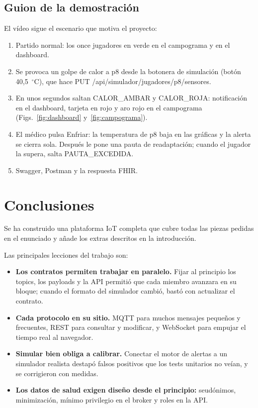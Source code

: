 \documentclass[runningheads]{llncs}
\begin{document}
\subsection{Guion de la demostración}

El vídeo sigue el escenario que motiva el proyecto:

\begin{enumerate}
  \item Partido normal: los once jugadores en verde en el campograma y en el dashboard.
  \item Se provoca un golpe de calor a p8 desde la botonera de simulación (botón 40,5~$^\circ$C), que hace PUT /api/simulador/jugadores/p8/sensores.
  \item En unos segundos saltan CALOR\_AMBAR y CALOR\_ROJA: notificación en el dashboard, tarjeta en rojo y aro rojo en el campograma (Figs.~\ref{fig:dashboard} y~\ref{fig:campograma}).
  \item El médico pulsa Enfriar: la temperatura de p8 baja en las gráficas y la alerta se cierra sola. Después le pone una pauta de readaptación; cuando el jugador la supera, salta PAUTA\_EXCEDIDA.
  \item Swagger, Postman y la respuesta FHIR.
\end{enumerate}

\section{Conclusiones}

Se ha construido una plataforma IoT completa que cubre todas las piezas pedidas en el enunciado y añade los extras descritos en la introducción.

Las principales lecciones del trabajo son:

\begin{itemize}
  \item \textbf{Los contratos permiten trabajar en paralelo.} Fijar al principio los topics, los payloads y la API permitió que cada miembro avanzara en su bloque; cuando el formato del simulador cambió, bastó con actualizar el contrato.
  \item \textbf{Cada protocolo en su sitio.} MQTT para muchos mensajes pequeños y frecuentes, REST para consultar y modificar, y WebSocket para empujar el tiempo real al navegador.
  \item \textbf{Simular bien obliga a calibrar.} Conectar el motor de alertas a un simulador realista destapó falsos positivos que los tests unitarios no veían, y se corrigieron con medidas.
  \item \textbf{Los datos de salud exigen diseño desde el principio:} seudónimos, minimización, mínimo privilegio en el broker y roles en la API.
\end{itemize}
\end{document}
